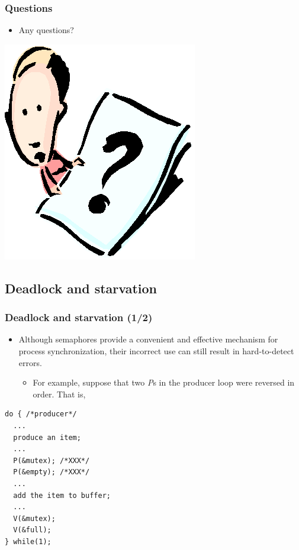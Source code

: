 \documentclass[CJKutf8,xcolor=pdftex,dvipsnames,table]{beamer}
\begin{document}
\begin{CJK*}{UTF8}{song}
  \begin{frame}
  \frametitle{Questions}
  \begin{itemize}
  \item{Any questions?}
  \end{itemize}
  \begin{center}
    \includegraphics[scale=.5]{question}
  \end{center}
  \end{frame}

\subsection{Deadlock and starvation}

  \begin{frame}[fragile]
  \frametitle{Deadlock and starvation (1/2)} \pause
  \begin{itemize}
  \item{Although semaphores provide a convenient and effective mechanism for process synchronization, their incorrect use can still result in hard-to-detect errors.} \pause
    \begin{itemize}
    \item{For example, suppose that two \emph{P}s in the producer loop were reversed in order. That is, } \pause
    \end{itemize}
  \end{itemize}
  \begin{minipage}[c]{0.5\textwidth}

\begin{lstlisting}
do { /*producer*/
  ...
  produce an item;
  ...
  P(&mutex); /*XXX*/
  P(&empty); /*XXX*/
  ...
  add the item to buffer;
  ...
  V(&mutex);
  V(&full);
} while(1);
\end{lstlisting}


\end{minipage}
\end{frame}
\end{CJK*}
\end{document}
